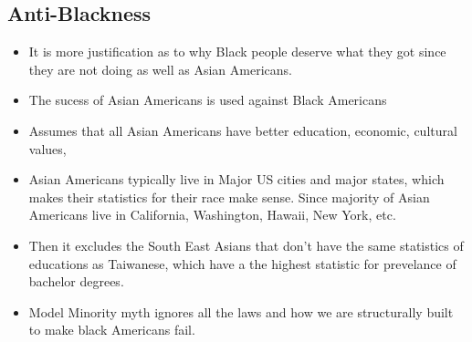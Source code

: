 \documentclass{article}
\begin{document}
\subsection{Anti-Blackness}
\begin{itemize}
  \item It is more justification as to why Black people deserve what they got
    since they are not doing as well as Asian Americans.
  \item The sucess of Asian Americans is used against Black Americans
  \item Assumes that all Asian Americans have better education, economic, cultural values,
  \item Asian Americans typically live in Major US cities and major states, which makes
    their statistics for their race make sense. Since majority of Asian Americans live in
    California, Washington, Hawaii, New York, etc.
  \item Then it excludes the South East Asians that don't have the same statistics of
      educations as Taiwanese, which have a the highest statistic for prevelance of bachelor degrees.
    \item Model Minority myth ignores all the laws and how we are structurally built to make
      black Americans fail.
\end{itemize}
\end{document}
